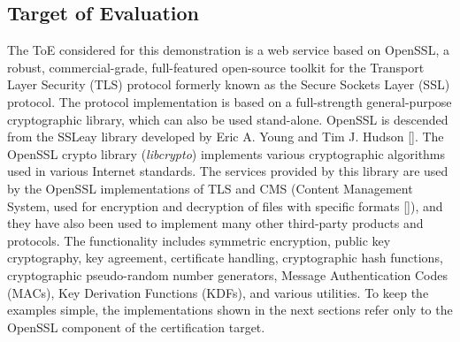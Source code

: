 \subsection{Target of Evaluation}
The ToE considered for this demonstration is a web service based on OpenSSL, a robust, commercial-grade, full-featured open-source toolkit for the Transport Layer Security (TLS) protocol formerly known as the Secure Sockets Layer (SSL) protocol. The protocol implementation is based on a full-strength general-purpose cryptographic library, which can also be used stand-alone.
OpenSSL is descended from the SSLeay library developed by Eric A. Young and Tim J. Hudson []. The OpenSSL crypto library (\textit{libcrypto}) implements various cryptographic algorithms used in various Internet standards. The services provided by this library are used by the OpenSSL implementations of TLS and CMS (Content Management System, used for encryption and decryption of files with specific formats []), and they have also been used to implement many other third-party products and protocols.
The functionality includes symmetric encryption, public key cryptography, key agreement, certificate handling, cryptographic hash functions, cryptographic pseudo-random number generators, Message Authentication Codes (MACs), Key Derivation Functions (KDFs), and various utilities. To keep the examples simple, the implementations shown in the next sections refer only to the OpenSSL component of the certification target.

